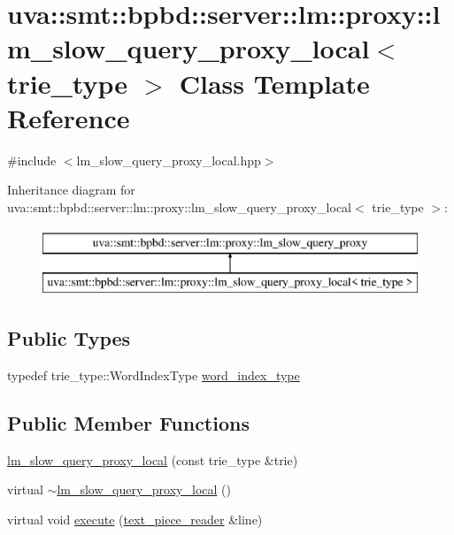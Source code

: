\hypertarget{classuva_1_1smt_1_1bpbd_1_1server_1_1lm_1_1proxy_1_1lm__slow__query__proxy__local}{}\section{uva\+:\+:smt\+:\+:bpbd\+:\+:server\+:\+:lm\+:\+:proxy\+:\+:lm\+\_\+slow\+\_\+query\+\_\+proxy\+\_\+local$<$ trie\+\_\+type $>$ Class Template Reference}
\label{classuva_1_1smt_1_1bpbd_1_1server_1_1lm_1_1proxy_1_1lm__slow__query__proxy__local}


{\ttfamily \#include $<$lm\+\_\+slow\+\_\+query\+\_\+proxy\+\_\+local.\+hpp$>$}

Inheritance diagram for uva\+:\+:smt\+:\+:bpbd\+:\+:server\+:\+:lm\+:\+:proxy\+:\+:lm\+\_\+slow\+\_\+query\+\_\+proxy\+\_\+local$<$ trie\+\_\+type $>$\+:\begin{figure}[H]
\begin{center}
\leavevmode
\includegraphics[height=2.000000cm]{classuva_1_1smt_1_1bpbd_1_1server_1_1lm_1_1proxy_1_1lm__slow__query__proxy__local}
\end{center}
\end{figure}
\subsection*{Public Types}
\begin{DoxyCompactItemize}
\item 
typedef trie\+\_\+type\+::\+Word\+Index\+Type \hyperlink{classuva_1_1smt_1_1bpbd_1_1server_1_1lm_1_1proxy_1_1lm__slow__query__proxy__local_a9c369473af9995e492a2101b03bfe5fe}{word\+\_\+index\+\_\+type}
\end{DoxyCompactItemize}
\subsection*{Public Member Functions}
\begin{DoxyCompactItemize}
\item 
\hyperlink{classuva_1_1smt_1_1bpbd_1_1server_1_1lm_1_1proxy_1_1lm__slow__query__proxy__local_a89e685540326c3dd02974505a372b8ee}{lm\+\_\+slow\+\_\+query\+\_\+proxy\+\_\+local} (const trie\+\_\+type \&trie)
\item 
virtual \hyperlink{classuva_1_1smt_1_1bpbd_1_1server_1_1lm_1_1proxy_1_1lm__slow__query__proxy__local_a12094e9ebe7122ca9924eb67a93ed576}{$\sim$lm\+\_\+slow\+\_\+query\+\_\+proxy\+\_\+local} ()
\item 
virtual void \hyperlink{classuva_1_1smt_1_1bpbd_1_1server_1_1lm_1_1proxy_1_1lm__slow__query__proxy__local_aa5196e2625ccfb71489b69ca7395c6ab}{execute} (\hyperlink{classuva_1_1utils_1_1file_1_1text__piece__reader}{text\+\_\+piece\+\_\+reader} \&line)
\end{DoxyCompactItemize}
